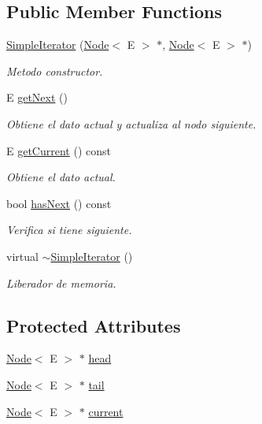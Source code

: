 \subsection*{Public Member Functions}
\begin{DoxyCompactItemize}
\item 
\hyperlink{class_simple_iterator_a643cab8769a566826092a5db6ace3267}{Simple\-Iterator} (\hyperlink{class_node}{Node}$<$ E $>$ $\ast$, \hyperlink{class_node}{Node}$<$ E $>$ $\ast$)
\begin{DoxyCompactList}\small\item\em Metodo constructor. \end{DoxyCompactList}\item 
E \hyperlink{class_simple_iterator_ab01032dba9ff4f1a1c47af3082b717d5}{get\-Next} ()
\begin{DoxyCompactList}\small\item\em Obtiene el dato actual y actualiza al nodo siguiente. \end{DoxyCompactList}\item 
E \hyperlink{class_simple_iterator_ac9460c98985a20f781f351c85b8a3ba2}{get\-Current} () const 
\begin{DoxyCompactList}\small\item\em Obtiene el dato actual. \end{DoxyCompactList}\item 
bool \hyperlink{class_simple_iterator_ab946b3d707e32d4d53f15af201ea2113}{has\-Next} () const 
\begin{DoxyCompactList}\small\item\em Verifica si tiene siguiente. \end{DoxyCompactList}\item 
virtual \hyperlink{class_simple_iterator_a02203109d263581340152408ebb120a2}{$\sim$\-Simple\-Iterator} ()
\begin{DoxyCompactList}\small\item\em Liberador de memoria. \end{DoxyCompactList}\end{DoxyCompactItemize}
\subsection*{Protected Attributes}
\begin{DoxyCompactItemize}
\item 
\hyperlink{class_node}{Node}$<$ E $>$ $\ast$ \hyperlink{class_simple_iterator_a0403100ab86dba958115cea4147508a7}{head}
\item 
\hyperlink{class_node}{Node}$<$ E $>$ $\ast$ \hyperlink{class_simple_iterator_a9bfb7d6c12bc1e8031b5c0869026415a}{tail}
\item 
\hyperlink{class_node}{Node}$<$ E $>$ $\ast$ \hyperlink{class_simple_iterator_a7777fefe265a5067ec9319d8c1a3e278}{current}
\end{DoxyCompactItemize}
